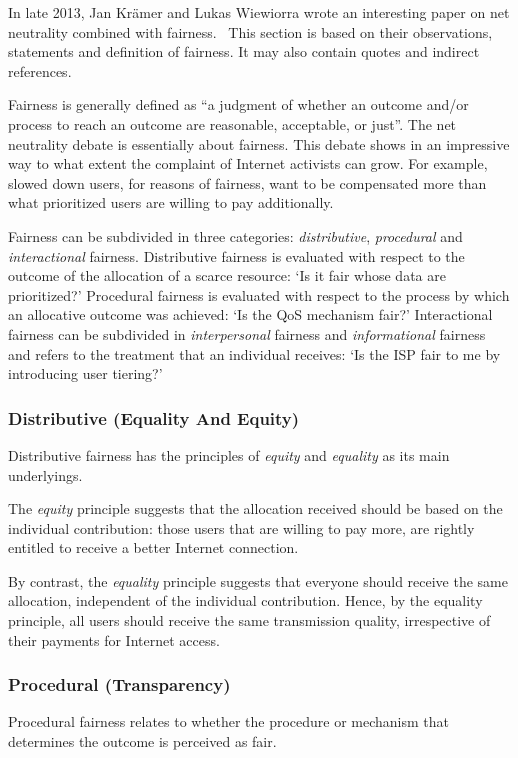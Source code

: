 
In late 2013, Jan Kr\"{a}mer and Lukas Wiewiorra wrote an interesting paper on net neutrality combined with fairness.~\cite{kramer2013fair} This section is based on their observations, statements and definition of fairness. It may also contain quotes and indirect references.

Fairness is generally defined as ``a judgment of whether an outcome and/or process to reach an outcome are reasonable, acceptable, or just''. The net neutrality debate is essentially about fairness. This debate shows in an impressive way to what extent the complaint of Internet activists can grow. For example, slowed down users, for reasons of fairness, want to be compensated more than what prioritized users are willing to pay additionally.

Fairness can be subdivided in three categories: \emph{distributive}, \emph{procedural} and \emph{interactional} fairness. Distributive fairness is evaluated with respect to the outcome of the allocation of a scarce resource: `Is it fair whose data are prioritized?' Procedural fairness is evaluated with respect to the process by which an allocative outcome was achieved: `Is the \ac{QoS} mechanism fair?' Interactional fairness can be subdivided in \emph{interpersonal} fairness and \emph{informational} fairness and refers to the treatment that an individual receives: `Is the \ac{ISP} fair to me by introducing user tiering?'

\subsubsection{Distributive (Equality And Equity)}
Distributive fairness has the principles of \emph{equity} and \emph{equality} as its main underlyings.

The \emph{equity} principle suggests that the allocation received should be based on the individual contribution: those users that are willing to pay more, are rightly entitled to receive a better Internet connection.

By contrast, the \emph{equality} principle suggests that everyone should receive the same allocation, independent of the individual contribution. Hence, by the equality principle, all users should receive the same transmission quality, irrespective of their payments for Internet access.

\subsubsection{Procedural (Transparency)}
Procedural fairness relates to whether the procedure or mechanism that determines the outcome is perceived as fair.

